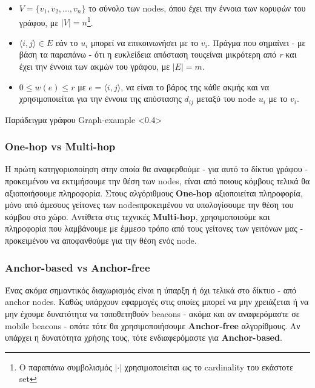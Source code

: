 \begin{itemize}
	\item $V = \{v_1, v_2, ..., v_n\}$ το σύνολο των nodes, όπου έχει την έννοια των κορυφών του γράφου, με $|V| = n$\footnote{Ο 
	παραπάνω συμβολισμός $|\cdot|$ χρησιμοποιείται ως το cardinality του εκάστοτε set}.
	\item $\langle i,j\rangle \in E$ εάν το $u_i$ μπορεί να επικοινωνήσει με το $v_i$. Πράγμα που σημαίνει - με βάση τα παραπάνω - 
	ότι η ευκλείδεια απόσταση τους\udot είναι μικρότερη από \emph{r} και έχει την έννοια των ακμών του γράφου, με $|E| = m$\footnotemark[\value{footnote}].
	\item $0 \le w(e) \le r$ με $e = \langle i,j\rangle$, να είναι το βάρος της κάθε ακμής και να χρησιμοποιείται για την έννοια της απόστασης $d_{ij}$
	μεταξύ του node $u_i$ με το $v_i$.
\end{itemize}

{Παράδειγμα γράφου}%
{Graph-example}%
<0.4>

\subsubsection{One-hop vs Multi-hop}
Η πρώτη κατηγοριοποίηση στην οποία θα αναφερθούμε - για αυτό το δίκτυο γράφου - προκειμένου να εκτιμήσουμε την θέση των nodes, 
είναι από ποιους κόμβους τελικά θα αξιοποιήσουμε πληροφορία. Στους αλγόριθμους \textbf{One-hop} αξιοποιείται πληροφορία,
μόνο από άμεσους γείτονες των nodes\udot προκειμένου να υπολογίσουμε την θέση του κόμβου στο χώρο. Αντίθετα 
στις τεχνικές \textbf{Multi-hop}, χρησιμοποιούμε και πληροφορία που λαμβάνουμε με έμμεσο τρόπο\udot
από τους γείτονες των γειτόνων μας - προκειμένου να αποφανθούμε για την θέση ενός node.

\subsubsection{Anchor-based vs Anchor-free}
Ένας ακόμα σημαντικός διαχωρισμός είναι η ύπαρξη ή όχι τελικά στο δίκτυο - από anchor nodes. Καθώς υπάρχουν εφαρμογές
στις οποίες μπορεί να μην χρειάζεται ή να μην έχουμε δυνατότητα να τοποθετηθούν beacons - ακόμα και αν αναφερόμαστε σε mobile beacons -
οπότε τότε θα χρησιμοποιήσουμε \textbf{Anchor-free} αλγορίθμους. Αν υπάρχει η δυνατότητα χρήσης τους, τότε ενδιαφερόμαστε για
\textbf{Anchor-based}.

